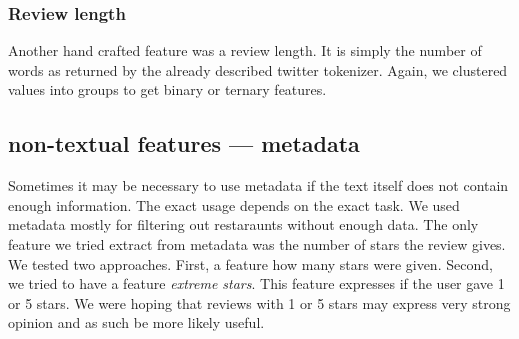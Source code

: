 \subsubsection{Review length}

Another hand crafted feature was a review length.
It is simply the number of words as returned by the already described twitter tokenizer.
Again, we clustered values into groups to get binary or ternary features.


\subsection{non-textual features --- metadata}

Sometimes it may be necessary to use metadata
if the text itself does not contain enough information.
The exact usage depends on the exact task.
We used metadata mostly for filtering out restaraunts without enough data.
The only feature we tried extract from metadata was the number of stars the review gives.
We tested two approaches.
First, a feature how many stars were given.
Second, we tried to have a feature \textit{extreme stars}.
This feature expresses if the user gave 1 or 5 stars. 
We were hoping that reviews with 1 or 5 stars may express very strong opinion
and as such be more likely useful.

